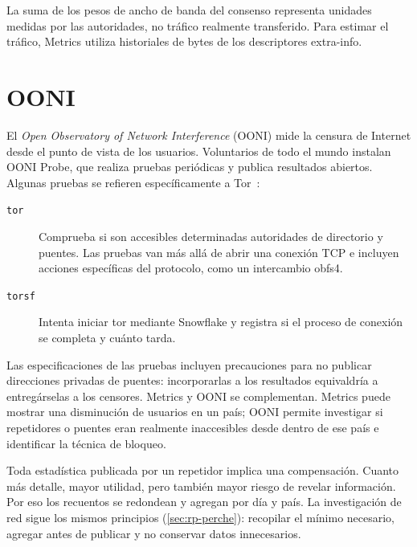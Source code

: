 La suma de los pesos de ancho de banda del consenso representa unidades medidas por las autoridades, no tráfico realmente transferido. Para estimar el tráfico, Metrics utiliza historiales de bytes de los descriptores extra-info.

\section{OONI}\label{sec:metrics-ooni}

El \emph{Open Observatory of Network Interference} (OONI) mide la censura de Internet desde el punto de vista de los usuarios. Voluntarios de todo el mundo instalan OONI Probe, que realiza pruebas periódicas y publica resultados abiertos. Algunas pruebas se refieren específicamente a Tor~\cite{oonitor}:
\begin{description}
  \item[\texttt{tor}] Comprueba si son accesibles determinadas autoridades de directorio y puentes. Las pruebas van más allá de abrir una conexión TCP e incluyen acciones específicas del protocolo, como un intercambio obfs4.
  \item[\texttt{torsf}] Intenta iniciar tor mediante Snowflake y registra si el proceso de conexión se completa y cuánto tarda.
\end{description}

Las especificaciones de las pruebas incluyen precauciones para no publicar direcciones privadas de puentes: incorporarlas a los resultados equivaldría a entregárselas a los censores. Metrics y OONI se complementan. Metrics puede mostrar una disminución de usuarios en un país; OONI permite investigar si repetidores o puentes eran realmente inaccesibles desde dentro de ese país e identificar la técnica de bloqueo.

\begin{approfondimento}
Toda estadística publicada por un repetidor implica una compensación. Cuanto más detalle, mayor utilidad, pero también mayor riesgo de revelar información. Por eso los recuentos se redondean y agregan por día y país. La investigación de red sigue los mismos principios (\cref{sec:rp-perche}): recopilar el mínimo necesario, agregar antes de publicar y no conservar datos innecesarios.
\end{approfondimento}


